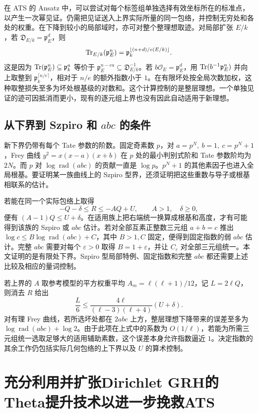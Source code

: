 \documentclass[UTF8,fontset=none,zihao=-4,a4paper]{ctexart}
\newcommand{\OO}{\mathcal O}
\newcommand{\rad}{\operatorname{rad}}
\begin{document}
在 ATS 的 Ansatz 中，可以尝试对每个标签组单独选择有效坐标所在的标准点，以产生一次幂见证。仍需把见证送入上界实际所量的同一包络，并控制无穷处和各处的权重。在下降到较小的局部域时，亦可对整个整理想取迹。对局部扩张 \(E/k\)，若 \(\mathfrak D_{E/k}=\mathfrak p_E^d\)，则
\[
 {\rm Tr}_{E/k}(\mathfrak p_E^n)
   =\mathfrak p_k^{\lfloor(n+d)/e(E/k)\rfloor}.
\]
这是因为 \({\rm Tr}(\mathfrak p_E^n)\subseteq \mathfrak p_k^a\) 等价于
\(\mathfrak p_E^{n-ea}\subseteq\mathfrak D_{E/k}^{-1}\)。若 \(b\OO_E=\mathfrak p_E^d\)，用 \({\rm Tr}(b^{-1}\mathfrak p_E^n)\) 并向上取整到 \(\mathfrak p_k^{\lceil n/e\rceil}\)，相对于 \(n/e\) 的额外指数小于 \(1\)。在有限坏处按全局次数加权，这种取整损失至多为坏处根基级的对数和。这个计算控制的是整层理想。一个单独见证的迹可因抵消而更小，现有的逐元组上界也没有因此自动适用于新理想。\cite{riemcode,adapt}

\subsection{从下界到 Szpiro 和 \texorpdfstring{\(abc\)}{abc} 的条件}
新下界仍带有每个 Tate 参数的阶数。固定奇素数 \(p\)，对 \(a=p^N,\ b=1,\ c=p^N+1\)，Frey 曲线 \(y^2=x(x-a)(x+b)\) 在 \(p\) 处的最小判别式阶和 Tate 参数阶均为 \(2N\)。而 \(p\) 对 \(\log\rad(abc)\) 的贡献一直是 \(\log p\)。\(p^N+1\) 的其他素因子也进入全局根基。要证明某一族曲线上的 Szpiro 型界，还须证明把这些重数与导子或根基相联系的估计。

若能在同一个实际包络上取得
\[
 -Q-\delta\le R\le-AQ+U,\qquad A>1,\quad \delta\ge0,
\]
便有 \((A-1)Q\le U+\delta\)。在适用族上把右端统一换算成根基和高度，才有可能得到该族的 Szpiro 或 \(abc\) 估计。若对全部互素正整数三元组 \(a+b=c\) 推出 \(\log c\le B\log\rad(abc)+C\)，其中 \(B>1,C\) 固定，便得到固定指数的弱 \(abc\) 估计。完整 \(abc\) 需要对每个 \(\varepsilon>0\) 取得 \(B=1+\varepsilon\)，并让 \(C_\varepsilon\) 对全部三元组统一。本文证明的是有限处下界。Szpiro 型局部特例、固定指数和完整 \(abc\) 都还需要上述比较及相应的量词控制。

若上界的 \(A\) 取参考模型的平方权重平均 \(A_m=\ell(\ell+1)/12\)，记 \(L=2\ell Q\)，则消去 \(R\) 给出
\[
 \frac L6\le \frac{4\ell}{(\ell-3)(\ell+4)}(U+\delta).
\]
对有理 Frey 曲线，若所选坏处都在 \(2abc\) 上方，整层理想下降带来的误差至多为 \(\log\rad(abc)+\log 2\)。由于此项在上式中的系数为 \(O(1/\ell)\)，若能为所需三元组统一选取足够大的适用辅助素数，这个误差本身允许指数逼近 \(1\)。决定指数的其余工作仍包括实际几何包络的上下界以及 \(U\) 的算术控制。\par

\section{充分利用并扩张Dirichlet GRH的Theta提升技术以进一步挽救ATS}
\end{document}
